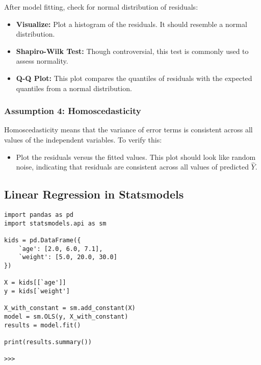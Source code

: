\documentclass{article}
\theoremstyle{definition}
\theoremstyle{theorem}
\theoremstyle{theorem}
\theoremstyle{theorem}
\theoremstyle{theorem}
\theoremstyle{definition}
\theoremstyle{definition}
\theoremstyle{definition}
\theoremstyle{definition}
\theoremstyle{definition}
\begin{document}
After model fitting, check for normal distribution of residuals:
\begin{itemize}
    \item \textbf{Visualize:} Plot a histogram of the residuals. It should resemble a normal distribution.
    \item \textbf{Shapiro-Wilk Test:} Though controversial, this test is commonly used to assess normality.
    \item \textbf{Q-Q Plot:} This plot compares the quantiles of residuals with the expected quantiles from a normal distribution.
\end{itemize}

\subsubsection*{Assumption 4: Homoscedasticity}

Homoscedasticity means that the variance of error terms is consistent across all values of the independent variables. To verify this:
\begin{itemize}
    \item Plot the residuals versus the fitted values. This plot should look like random noise, indicating that residuals are consistent across all values of predicted \( \hat{Y} \).
\end{itemize}


\subsection{Linear Regression in Statsmodels}

\begin{verbatim}
import pandas as pd
import statsmodels.api as sm

kids = pd.DataFrame({
    `age': [2.0, 6.0, 7.1],
    `weight': [5.0, 20.0, 30.0]
})

X = kids[[`age']]
y = kids[`weight']

X_with_constant = sm.add_constant(X)
model = sm.OLS(y, X_with_constant)
results = model.fit()

print(results.summary())

>>>
\end{verbatim}
\end{document}
